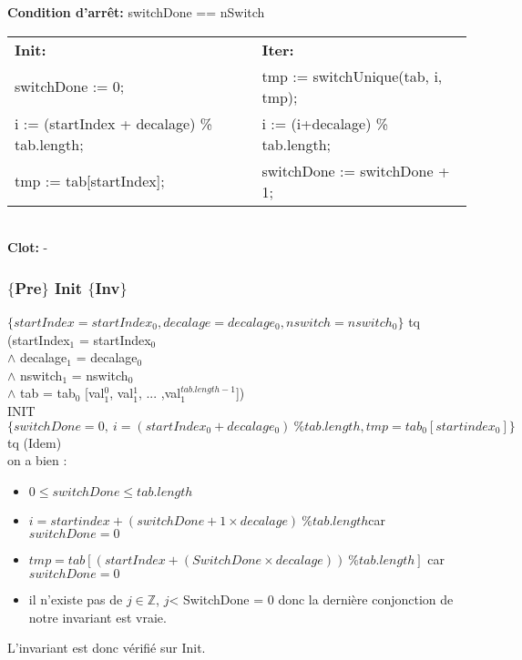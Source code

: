 \noindent \textbf{Condition d'arrêt:} switchDone == nSwitch\\

\noindent \begin{tabular}{l|l}
\textbf{Init:} & \textbf{Iter: }\\
switchDone := 0; & tmp := switchUnique(tab, i, tmp);\\
i := (startIndex + decalage) \% tab.length; & i := (i+decalage) \% tab.length;\\
tmp := tab[startIndex]; & switchDone := switchDone + 1;\\
\end{tabular}\\

\noindent \textbf{Clot: } -\\

\subsubsection*{$\{$Pre$\}$ Init $\{$Inv$\}$}

$\{startIndex = startIndex_{0}, decalage = decalage_{0}, nswitch = nswitch_{0} \}$ tq (startIndex$_{1}$ = startIndex$_{0}$ \\
$\wedge$ decalage$_{1}$ = decalage$_{0}$\\
$\wedge$ nswitch$_{1}$ = nswitch$_{0}$\\
$\wedge$ tab = tab$_{0}$ [val$_{1}^{0}$, val$_{1}^{1}$, ... ,val$_{1}^{tab.length-1}$])\\

INIT \\

$\{switchDone = 0,\ i = (startIndex_0 + decalage_0)\ \% tab.length, tmp = tab_0[startindex_0]\}$ tq (Idem)\\
on a bien : 
\begin{itemize}
	\item $0\leq switchDone \leq tab.length$
	\item $i = startindex + (switchDone+1\times decalage)\ \% tab.length $car$ switchDone = 0$
	\item $tmp = tab[(startIndex + (SwitchDone\times decalage))\ \% tab.length]$ car $switchDone = 0$
	\item il n'existe pas de $j \in \mathbb{Z}$, $j$< SwitchDone = 0 donc la dernière conjonction de notre invariant est vraie. \\
\end{itemize}


L'invariant est donc vérifié sur Init.

